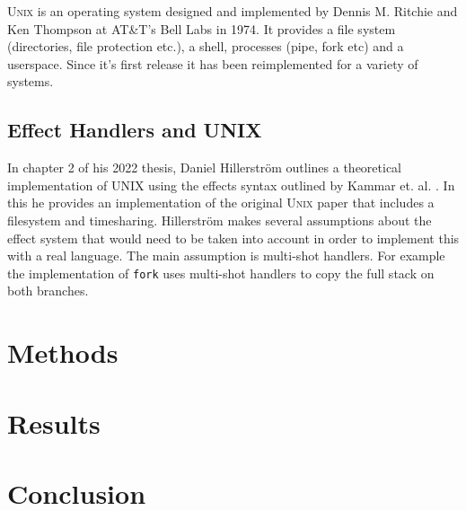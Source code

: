 \documentclass{report}
\begin{document}
\textsc{Unix} \cite{ritchie1978unix} is an operating system designed and
implemented by Dennis M. Ritchie and Ken Thompson at AT\&T's Bell Labs in 1974.
It provides a file system (directories, file protection etc.), a shell,
processes (pipe, fork etc) and a userspace. Since it's first release it has been
reimplemented for a variety of systems.

\section{Effect Handlers and UNIX}

In chapter 2 of his 2022 thesis, Daniel Hillerstr\"{o}m
\cite{hillerstrom2022foundations} outlines a theoretical implementation of UNIX
using the effects syntax outlined by Kammar et. al. \cite{kammar2013handlers}.
In this he provides an implementation of the original \textsc{Unix} paper
\cite{ritchie1978unix} that includes a filesystem and timesharing.
Hillerstr\"{o}m makes several assumptions about the effect system that would
need to be taken into account in order to implement this with a real language.
The main assumption is multi-shot handlers. For example the implementation of
\texttt{fork} uses multi-shot handlers to copy the full stack on both branches. 

\chapter{Methods}

\chapter{Results}

\chapter{Conclusion}



\end{document}
